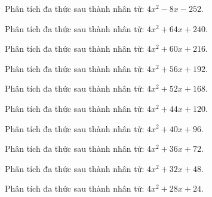 \begin{bt}
	Phân tích đa thức sau thành nhân tử: $4 x^2 - 8 x - 252$.
\end{bt}
\begin{bt}
	Phân tích đa thức sau thành nhân tử: $4 x^2 + 64 x + 240$.
\end{bt}
\begin{bt}
	Phân tích đa thức sau thành nhân tử: $4 x^2 + 60 x + 216$.
\end{bt}
\begin{bt}
	Phân tích đa thức sau thành nhân tử: $4 x^2 + 56 x + 192$.
\end{bt}
\begin{bt}
	Phân tích đa thức sau thành nhân tử: $4 x^2 + 52 x + 168$.
\end{bt}
\begin{bt}
	Phân tích đa thức sau thành nhân tử: $4 x^2 + 44 x + 120$.
\end{bt}
\begin{bt}
	Phân tích đa thức sau thành nhân tử: $4 x^2 + 40 x + 96$.
\end{bt}
\begin{bt}
	Phân tích đa thức sau thành nhân tử: $4 x^2 + 36 x + 72$.
\end{bt}
\begin{bt}
	Phân tích đa thức sau thành nhân tử: $4 x^2 + 32 x + 48$.
\end{bt}
\begin{bt}
	Phân tích đa thức sau thành nhân tử: $4 x^2 + 28 x + 24$.
\end{bt}
